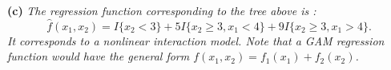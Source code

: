 \documentclass[12pt, answers]{exam}
\begin{document}
\textbf{(c)} \textit{The regression function corresponding to the tree above is :}
\begin{equation*}
\widehat{f}(x_1,x_2)=I\{x_2<3\}+5I\{x_2\ge3, x_1<4\}+9I\{x_2\ge3, x_1>4\}.
\end{equation*}
\textit{It corresponds to a nonlinear interaction model.  Note that a GAM regression function would have the general form $f(x_1,x_2)=f_1(x_1)+f_2(x_2)$.}
\end{document}
